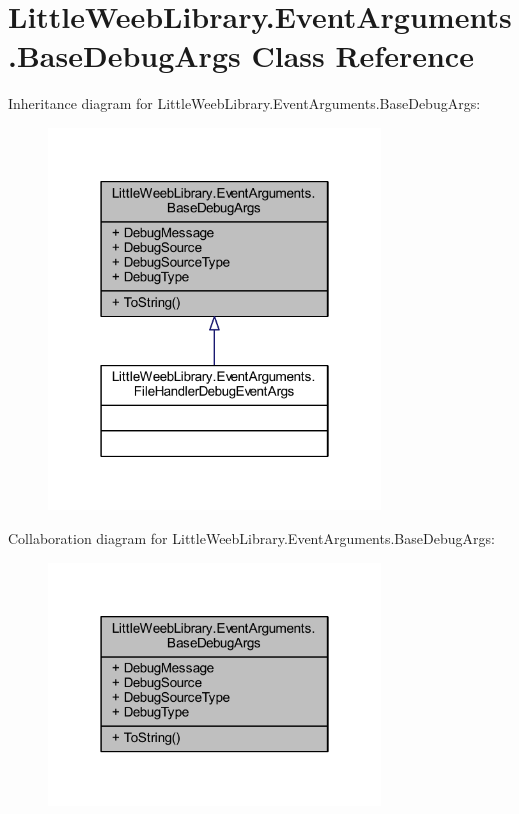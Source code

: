 \hypertarget{class_little_weeb_library_1_1_event_arguments_1_1_base_debug_args}{}\section{Little\+Weeb\+Library.\+Event\+Arguments.\+Base\+Debug\+Args Class Reference}
\label{class_little_weeb_library_1_1_event_arguments_1_1_base_debug_args}


Inheritance diagram for Little\+Weeb\+Library.\+Event\+Arguments.\+Base\+Debug\+Args\+:\nopagebreak
\begin{figure}[H]
\begin{center}
\leavevmode
\includegraphics[width=250pt]{class_little_weeb_library_1_1_event_arguments_1_1_base_debug_args__inherit__graph}
\end{center}
\end{figure}


Collaboration diagram for Little\+Weeb\+Library.\+Event\+Arguments.\+Base\+Debug\+Args\+:\nopagebreak
\begin{figure}[H]
\begin{center}
\leavevmode
\includegraphics[width=250pt]{class_little_weeb_library_1_1_event_arguments_1_1_base_debug_args__coll__graph}
\end{center}
\end{figure}
